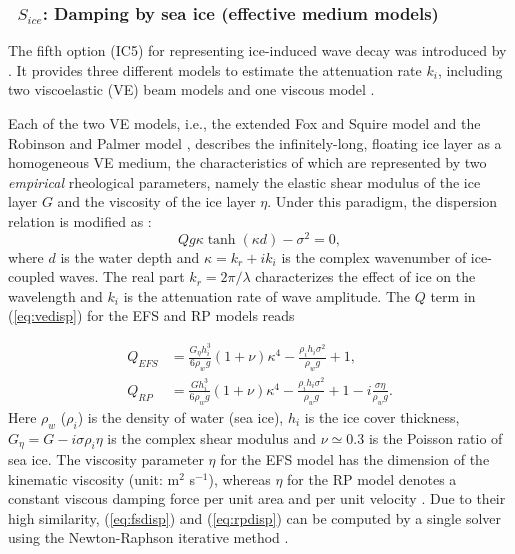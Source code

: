 \vsssub
\subsubsection{~$S_{ice}$: Damping by sea ice (effective medium models)} \label{sec:ICE5}
\vsssub


\noindent
The fifth option ({\code IC5}) for representing ice-induced wave decay was introduced by \citet{Liu2020}. It provides three different models to estimate the attenuation rate $k_i$, including two viscoelastic (VE) beam models \citep{art:MMS15} and one viscous model \citep{Meylan2018}.

Each of the two VE models, i.e., the extended Fox and Squire model \citep[hereafter the EFS model; see also][]{art:FS1994} and the Robinson and Palmer model \citep[][hereafter the RP model]{Robinson1990}, describes the infinitely-long, floating ice layer as a homogeneous VE medium, the characteristics of which are represented by two \emph{empirical} rheological parameters, namely the elastic shear modulus of the ice layer $G$ and the viscosity of the ice layer $\eta$. Under this paradigm, the dispersion relation is modified as \citep{art:MMS15}:
\begin{equation}
Q g \kappa \tanh(\kappa d)-\sigma^2 = 0,
\label{eq:vedisp}
\end{equation}
where $d$ is the water depth and $\kappa = k_r + i k_i$ is the complex wavenumber of ice-coupled waves. The real part $k_r = 2\pi / \lambda$ characterizes the effect of ice on the wavelength and $k_i$ is the attenuation rate of wave amplitude. The $Q$ term in (\ref{eq:vedisp}) for the EFS and RP models reads

\begin{align}
Q_{EFS} &= \frac{G_{\eta} h_i^3}{6 \rho_w g} (1+\nu) \kappa^4 - \frac{\rho_i h_i \sigma^2}{\rho_w g} + 1,\label{eq:fsdisp}\\
%
Q_{RP}  &= \frac{G h_i^3}{6 \rho_w g} (1+\nu) \kappa^4 - \frac{\rho_i h_i \sigma^2}{\rho_w g} + 1 - i \frac{\sigma \eta}{\rho_w g}.\label{eq:rpdisp}
\end{align}
Here $\rho_w$ ($\rho_i$) is the density of water (sea ice), $h_i$ is the ice cover thickness, $G_{\eta}=G- i \sigma \rho_i \eta$ is the complex shear modulus and $\nu \simeq 0.3$ is the Poisson ratio of sea ice. The viscosity parameter $\eta$ for the EFS model has the dimension of the kinematic viscosity (unit: m$^2$ s$^{-1}$), whereas $\eta$ for the RP model denotes a constant viscous damping force per unit area and per unit velocity \citep[unit: kg m$^{-2}$ s$^{-1}$;][]{Meylan2018}. Due to their high similarity, (\ref{eq:fsdisp}) and (\ref{eq:rpdisp}) can be computed by a single solver using the Newton-Raphson iterative method \citep[see Appendix of][]{Liu2020}.

